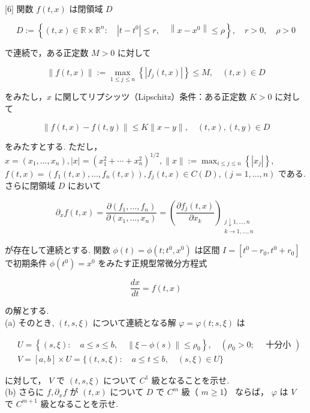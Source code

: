 \documentclass{jsarticle}
\begin{document}
\begin{itembox}[l]{[6]}
関数 $f(t, x)$ は閉領域 $D$

\begin{equation*}
D:=\left\{(t, x) \in \mathbb{R} \times \mathbb{R}^{n}: \quad\left|t-t^{0}\right| \leqslant r, \quad\left\|x-x^{0}\right\| \leqslant \rho\right\}, \quad r>0, \quad \rho>0 \tag{11}
\end{equation*}


で連続で，ある正定数 $M>0$ に対して


\begin{equation*}
\|f(t, x)\|:=\max _{1 \leqslant j \leqslant n}\left\{\left|f_{j}(t, x)\right|\right\} \leqslant M, \quad(t, x) \in D \tag{12}
\end{equation*}


をみたし，$x$ に関してリプシッツ（Lipschitz）条件：ある正定数 $K>0$ に対して


\begin{equation*}
\|f(t, x)-f(t, y)\| \leqslant K\|x-y\|, \quad(t, x),(t, y) \in D \tag{13}
\end{equation*}


をみたすとする. ただし， $x=\left(x_{1}, \ldots, x_{n}\right),|x|=\left(x_{1}^{2}+\cdots+x_{n}^{2}\right)^{1 / 2},\|x\|:=\max _{i \leqslant j \leqslant n}\left\{\left|x_{j}\right|\right\}$, $f(t, x)=\left(f_{1}(t, x), \ldots, f_{n}(t, x)\right), f_{j}(t, x) \in C(D),(j=1, \ldots, n)$ である. さらに閉領域 $D$ において


\begin{equation*}
\partial_{x} f(t, x)=\frac{\partial\left(f_{1}, \ldots, f_{n}\right)}{\partial\left(x_{1}, \ldots, x_{n}\right)}=\left(\frac{\partial f_{j}(t, x)}{\partial x_{k}}\right)_{\substack{j \downarrow 1, \ldots, n \\ k \rightarrow 1, \ldots, n}} \tag{14}
\end{equation*}


が存在して連続とする. 関数 $\phi(t)=\phi\left(t ; t^{0}, x^{0}\right)$ は区間 $I=\left[t^{0}-r_{0}, t^{0}+r_{0}\right]$ で初期条件 $\phi\left(t^{0}\right)=x^{0}$ をみたす正規型常微分方程式


\begin{equation*}
\frac{d x}{d t}=f(t, x) \tag{15}
\end{equation*}


の解とする.\\
(a) そのとき, $(t, s, \xi)$ について連続となる解 $\varphi=\varphi(t ; s, \xi)$ は


\begin{align*}
& U=\left\{(s, \xi): \quad a \leqslant s \leqslant b, \quad\|\xi-\phi(s)\| \leqslant \rho_{0}\right\}, \quad\left(\rho_{0}>0 ; \quad \text { 十分小 }\right)  \tag{16}\\
& V=[a, b] \times U=\{(t, s, \xi): \quad a \leqslant t \leqslant b, \quad(s, \xi) \in U\} \tag{17}
\end{align*}


に対して， $V$ で $(t, s, \xi)$ について $C^{1}$ 級となることを示せ.\\
(b) さらに $f, \partial_{x} f$ が $(t, x)$ について $D$ で 
$C^{m}$ 級（ $ m \geq 1）$ ならば， $\varphi$ は $V$ で $C^{m+1}$ 級となることを示せ.  
\end{itembox}
\end{document}
